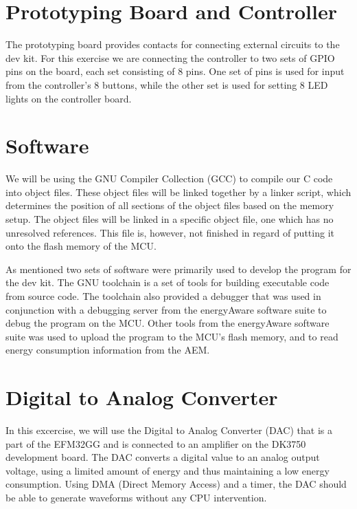 \section{Prototyping Board and Controller}

The prototyping board provides contacts for connecting external circuits to the
dev kit. \cite{DK3750Manual} For this exercise we are connecting the controller
to two sets of GPIO pins on the board, each set consisting of 8 pins. One set of
pins is used for input from the controller's 8 buttons, while the other set is
used for setting 8 LED lights on the controller board.

\section{Software}

We will be using the GNU Compiler Collection (GCC) to compile our C code into
object files. These object files will be linked together by a linker script,
which determines the position of all sections of the object files based on the
memory setup. The object files will be linked in a specific object file, one
which has no unresolved references. This file is, however, not finished in
regard of putting it onto the flash memory of the MCU. \cite{TDT4528Compendium}

As mentioned two sets of software were primarily used to develop the program for
the dev kit. The GNU toolchain is a set of tools for building executable code
from source code. The toolchain also provided a debugger that was used in
conjunction with a debugging server from the energyAware software suite to debug
the program on the MCU. Other tools from the energyAware software suite was used
to upload the program to the MCU's flash memory, and to read energy consumption
information from the AEM. \cite{TDT4528Compendium}

\section{Digital to Analog Converter}

In this excercise, we will use the Digital to Analog Converter (DAC) that is a
part of the EFM32GG and is connected to an amplifier on the DK3750 development
board. \cite{TDT4528Compendium} The DAC converts a digital value to an analog
output voltage, using a limited amount of energy and thus maintaining a low
energy consumption. Using DMA (Direct Memory Access) and a timer, the DAC should
be able to generate waveforms without any CPU intervention. \cite{EFM32GGManual}

